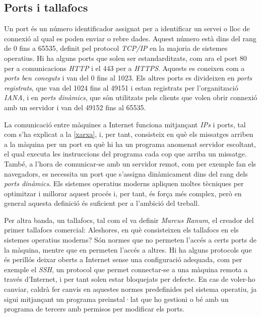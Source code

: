 \subsection{Ports i tallafocs}

Un port és un número identificador assignat per a identificar un servei o lloc de connexió al qual es poden enviar o rebre dades. Aquest número està dins del rang de 0 fins a 65535, definit pel protocol \textit{TCP/IP} en la majoria de sistemes operatius. Hi ha alguns ports que solen ser estandarditzats, com ara el port 80 per a comunicacions \textit{HTTP} i el 443 per a \textit{HTTPS}. Aquests es coneixen com a \textit{ports ben coneguts} i van del 0 fins al 1023. Els altres ports es divideixen en \textit{ports registrats}, que van del 1024 fins al 49151 i estan registrats per l’organització \textit{IANA}, i en \textit{ports dinàmics}, que són utilitzats pels clients que volen obrir connexió amb un servidor i van del 49152 fins al 65535.

La comunicació entre màquines a Internet funciona mitjançant \textit{IPs} i ports, tal com s'ha explicat a la \autoref{xarxa}, i, per tant, consisteix en què els missatges arriben a la màquina per un port en què hi ha un programa anomenat servidor escoltant, el qual executa les instruccions del programa cada cop que arriba un missatge. També, a l'hora de comunicar-se amb un servidor remot, com per exemple fan els navegadors, es necessita un port que s'assigna dinàmicament dins del rang dels \textit{ports dinàmics}. Els sistemes operatius moderns apliquen moltes tècniques per optimitzar i millorar aquest procés i, per tant, és força més complex, però en general aquesta definició és suficient per a l'ambició del treball.\cite{benvenuti_understanding_2005}

\newpage
Per altra banda, un tallafocs, tal com el va definir \textit{Marcus Ranum}, el creador del primer tallafocs comercial: 
Aleshores, en què consisteixen els tallafocs en els sistemes operatius moderns? Són normes que no permeten l'accés a certs ports de la màquina, mentre que en permeten l'accés a altres. Hi ha alguns protocols que és perillós deixar oberts a Internet sense una configuració adequada, com per exemple el \textit{SSH}, un protocol que permet connectar-se a una màquina remota a través d'Internet, i per tant solen estar bloquejats per defecte. En cas de voler-ho canviar, caldrà fer canvis en aquestes normes predefinides pel sistema operatiu, ja sigui mitjançant un programa preinstal·lat que ho gestioni o bé amb un programa de tercers amb permisos per modificar els ports.

